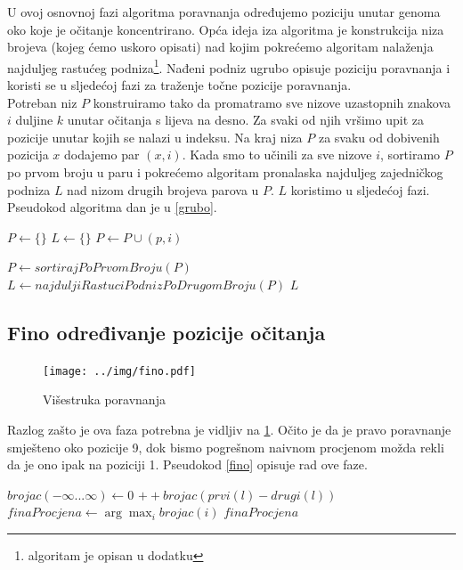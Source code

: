\documentclass[times, utf8, diplomski]{fer}
\begin{document}
U ovoj osnovnoj fazi algoritma poravnanja određujemo poziciju unutar genoma oko koje je očitanje koncentrirano. Opća ideja iza algoritma je konstrukcija niza brojeva (kojeg ćemo uskoro opisati) nad kojim pokrećemo algoritam nalaženja najduljeg rastućeg podniza\footnote{algoritam je opisan u dodatku}. Nađeni podniz ugrubo opisuje poziciju poravnanja i koristi se u sljedećoj fazi za traženje točne pozicije poravnanja.\\
Potreban niz $P$ konstruiramo tako da promatramo sve nizove uzastopnih znakova $i$ duljine $k$ unutar očitanja s lijeva na desno. Za svaki od njih vršimo upit za pozicije unutar kojih se nalazi u indeksu. Na kraj niza $P$ za svaku od dobivenih pozicija $x$ dodajemo par $(x,i)$. Kada smo to učinili za sve nizove $i$, sortiramo $P$ po prvom broju u paru i pokrećemo algoritam pronalaska najduljeg zajedničkog podniza $L$ nad nizom drugih brojeva parova u $P$. $L$ koristimo u sljedećoj fazi. Pseudokod algoritma dan je u \ref{grubo}.



\begin{algorithm}[H]
\begin{algorithmic}
\State $P \gets \{\}$
\State $L \gets \{\}$
		\State $P \gets P \cup (p, i) $
	\EndFor
	
	\State $P \gets sortirajPoPrvomBroju(P)$
	\State $L \gets najduljiRastuciPodnizPoDrugomBroju(P)$
	\State \Return $L$
\EndFor

\end{algorithmic}
\caption{$GruboPoravnanje(O)$}\label{grubo}
\end{algorithm}


\subsection{Fino određivanje pozicije očitanja}

\begin{figure}[H]
\centering
\texttt{[image: ../img/fino.pdf]}
\caption{Višestruka poravnanja}\label{img:fino}
\end{figure}

Razlog zašto je ova faza potrebna je vidljiv na \ref{img:fino}. Očito je da je pravo poravnanje smješteno oko pozicije 9, dok bismo pogrešnom naivnom procjenom možda rekli da je ono ipak na poziciji 1. Pseudokod \ref{fino} opisuje rad ove faze.

\begin{algorithm}[H]
\begin{algorithmic}
\State $brojac(-\infty...\infty) \gets 0$
	\State $++brojac(prvi(l)-drugi(l))$
\EndFor
\State $finaProcjena \gets \arg\max_i brojac(i)$
\State \Return $finaProcjena$
\end{algorithmic}
\caption{$FinoPoravnanje(L)$}\label{fino}
\end{algorithm}
\end{document}
